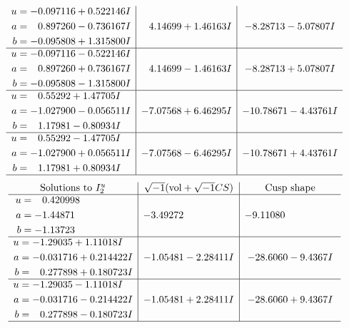 \documentclass[1p]{elsarticle_modified}
\theoremstyle{definition}
\newcommand{\I}{\sqrt{-1}}
\begin{document}
$$\begin{array}{c|c|c}
\begin{aligned}
u &= -0.097116 + 0.522146 I \\
a &= \phantom{-}0.897260 - 0.736167 I \\
b &= -0.095808 + 1.315800 I\end{aligned}
 & \phantom{-}4.14699 + 1.46163 I & -8.28713 - 5.07807 I \\ \hline\begin{aligned}
u &= -0.097116 - 0.522146 I \\
a &= \phantom{-}0.897260 + 0.736167 I \\
b &= -0.095808 - 1.315800 I\end{aligned}
 & \phantom{-}4.14699 - 1.46163 I & -8.28713 + 5.07807 I \\ \hline\begin{aligned}
u &= \phantom{-}0.55292 + 1.47705 I \\
a &= -1.027900 - 0.056511 I \\
b &= \phantom{-}1.17981 - 0.80934 I\end{aligned}
 & -7.07568 + 6.46295 I & -10.78671 - 4.43761 I \\ \hline\begin{aligned}
u &= \phantom{-}0.55292 - 1.47705 I \\
a &= -1.027900 + 0.056511 I \\
b &= \phantom{-}1.17981 + 0.80934 I\end{aligned}
 & -7.07568 - 6.46295 I & -10.78671 + 4.43761 I\\
 \hline 
 \end{array}$$\newpage$$\begin{array}{c|c|c}  
\text{Solutions to }I^u_{2}& \I (\text{vol} + \sqrt{-1}CS) & \text{Cusp shape}\\
 \hline 
\begin{aligned}
u &= \phantom{-}0.420998\phantom{ +0.000000I} \\
a &= -1.44871\phantom{ +0.000000I} \\
b &= -1.13723\phantom{ +0.000000I}\end{aligned}
 & -3.49272\phantom{ +0.000000I} & -9.11080\phantom{ +0.000000I} \\ \hline\begin{aligned}
u &= -1.29035 + 1.11018 I \\
a &= -0.031716 + 0.214422 I \\
b &= \phantom{-}0.277898 + 0.180723 I\end{aligned}
 & -1.05481 - 2.28411 I & -28.6060 - 9.4367 I \\ \hline\begin{aligned}
u &= -1.29035 - 1.11018 I \\
a &= -0.031716 - 0.214422 I \\
b &= \phantom{-}0.277898 - 0.180723 I\end{aligned}
 & -1.05481 + 2.28411 I & -28.6060 + 9.4367 I\\
 \hline 
 \end{array}$$\newpage
\end{document}
